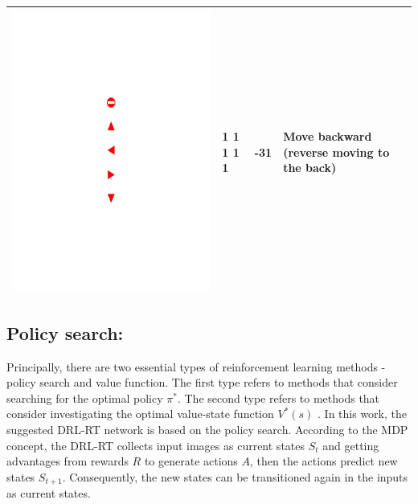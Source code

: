 \documentclass[conference]{IEEEtran}
\begin{document}
\begin{table}[!h]
\begin{tabular}{|c|C{1.5cm}|C{1.5cm}|C{2.3cm}|}
				\begin{minipage}{.075\textwidth}\includegraphics[scale=.5,trim=9.1cm 8.5cm 9.5cm 18cm,clip]{signs.pdf}\end{minipage} & 1 1 1 1 1 & -31 & Move backward (reverse moving to the back) \\ \hline
			\end{tabular}
		\end{table}
	
	\subsection{Policy search:} 
		Principally, there are two essential types of reinforcement learning methods - policy search and value function. The first type refers to methods that consider searching for the optimal policy $\pi^*$. The second type refers to methods that consider investigating the optimal value-state function $V^*(s)$ \cite{Arulkumaran2017Deep}. In this work, the suggested DRL-RT network is based on the policy search. According to the MDP concept, the DRL-RT collects input images as current states $S_t$ and getting advantages from rewards $R$ to generate actions $A$, then the actions predict new states $S_{t+1}$. Consequently, the new states can be transitioned again in the inputs as current states. 
		
\end{document}
